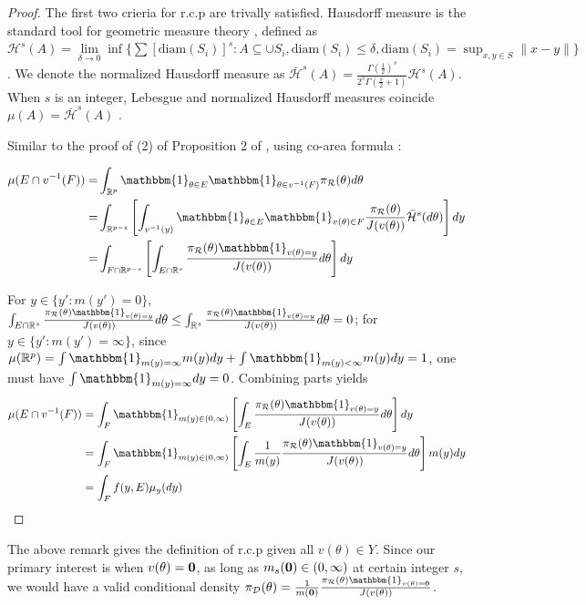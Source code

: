 \documentclass[10pt]{article}
\newcommand{\be}{\begin{equation}\begin{aligned}}
\newcommand{\ee}{\end{aligned}\end{equation}}
\newcommand{\bb}[1]{\mathbb{#1}}
\newcommand{\mc}[1]{\mathcal{#1}}
\DeclareMathOperator{\1}{\mathbbm{1}}
\begin{document}
\begin{proof} The first two crieria for r.c.p are trivally satisfied. Hausdorff measure is the standard tool for geometric measure theory \citep{federer2014geometric}, defined as $\mc H^{s}(A)= \underset{\delta\rightarrow 0}\lim \inf \{ \sum \left[{\text{diam}(S_i)}\right]^s: {A\subseteq \cup S_i, \text{diam}(S_i)\le \delta}, \text{diam}(S_i)=\sup_{x,y\in S}\|x-y\|\}$. We denote the normalized Hausdorff measure as $\bar{\mc H}^{s}(A) =\frac{\Gamma(\frac{1}{2})^{s}}{2^s \Gamma(\frac{s}{2}+1)} \mc H^{s}(A)$. When $s$ is an integer, Lebesgue and normalized Hausdorff measures coincide  $\mu(A)= \bar{\mc H}^{s}(A)$ \citep{evans2015measure}.

Similar to the proof of (2) of Proposition 2 of \cite{diaconis2013manifold}, using co-area formula \citep{federer2014geometric}:

\be
\mu(E\cap v^{-1}(F))= & \int_{\bb R^p} \mathbbm{1}_{\theta \in E} \mathbbm{1}_{\theta \in v^{-1}(F)}\pi_{\mc R}(\theta) d\theta \\
= & \int_{\bb R^{p-s}} \left[ \int_{v^{-1}(y)} \mathbbm{1}_{\theta \in E} \mathbbm{1}_{v(\theta) \in F}  \frac{ \pi_{\mc R}(\theta)}{J(v(\theta))} \bar{\mc H}^{s}(d\theta)\right] dy \\
= & \int_{F\cap \bb R^{p-s}} \left [ \int_{ E \cap \bb R^{s}}  \frac{ \pi_{\mc R}(\theta) \mathbbm{1}_{v(\theta)=y}}{J(v(\theta))} d\theta  \right] dy \\
\ee


For $y\in \{y':m(y')=0\}$, $\int_{ E \cap \bb R^{s}}  \frac{ \pi_{\mc R}(\theta) \mathbbm{1}_{v(\theta)=y}}{J(v(\theta))} d\theta \le \int_{ \bb R^{s}}  \frac{ \pi_{\mc R}(\theta) \mathbbm{1}_{v(\theta)=y}}{J(v(\theta))} d\theta =0$; for $y\in \{y':m(y')=\infty\}$, since $\mu(\bb R^p)=\int \mathbbm{1}_{m(y)=\infty}m(y) dy + \int  \mathbbm{1}_{m(y)<\infty}m(y)  dy=1$, one must have $\int \mathbbm{1}_{m(y)=\infty} dy=0$. Combining parts yields
\be
\mu(E\cap v^{-1}(F)) & = \int_{F} \mathbbm{1}_{m(y)\in (0,\infty)}\left[
\int_{E} \frac{\pi_{\mc
R}(\theta) \mathbbm{1}_{v({\theta})=y}}{J(v(\theta))}
d\theta \right] dy \\
& = \int_{F} \mathbbm{1}_{m(y)\in (0,\infty)}
\left[ \int_{E}  \frac{1}{m(y)}  \frac{\pi_{\mc
R}(\theta) \mathbbm{1}_{v({\theta})=y}}{J(v(\theta))}
d\theta \right ]  m(y) dy\\
& =\int_F f(y,E) \mu_y(dy) 
\ee

\end{proof}

The above remark gives the definition of r.c.p given all $v(\theta)\in Y$. Since our primary interest is when $v(\theta)=\bf 0$, as long as $m_s({\bf 0})\in (0,\infty)$ at certain integer $s$, we would have a valid conditional density $\pi_{\mc D}(\theta)=
\frac{1}{m({\bf 0})}  \frac{\pi_{\mc
R}(\theta) \mathbbm{1}_{v({\theta})={\bf 0}}}{J(v(\theta))}$. 
\end{document}
